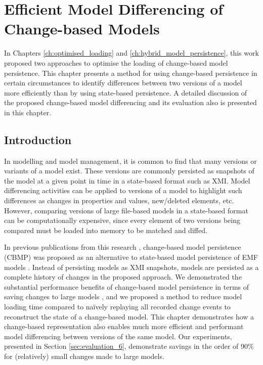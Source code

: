 \chapter{Efficient Model Differencing of Change-based Models}
\label{ch:model_differencing}

In Chapters \ref{ch:optimised_loading} and \ref{ch:hybrid_model_persistence}, this work proposed two approaches to optimise the loading of change-based model persistence. This chapter presents a method for using change-based persistence in certain circumstances to identify differences between two versions of a model more efficiently than by using state-based persistence. A detailed discussion of the proposed change-based model differencing and its evaluation also is presented in this chapter.

\section{Introduction}
\label{sec:introduction_06}
In modelling and model management, it is common to find that many versions or variants of a model exist. These versions are commonly persisted as snapshots of the model at a given point in time in a state-based format such as XMI. Model differencing activities can be applied to versions of a model to highlight such differences as changes in properties and values, new/deleted elements, etc. However, comparing versions of large file-based
models in a state-based format can be computationally expensive, since every element of two versions being compared must be loaded into memory to be matched and diffed.

In previous publications from this research \cite{DBLP:conf/models/YohannisKP17,yohannis2018towards,DBLP:conf/models/YohannisRPK18}, change-based model persistence (CBMP) was proposed as an alternative to state-based model persistence of EMF models \cite{steinberg2008emf}. Instead of persisting models as XMI snapshots, models are persisted as a complete history of changes in the proposed approach. We demonstrated the substantial performance benefits of change-based model persistence in terms of saving changes to large models \cite{DBLP:conf/models/YohannisKP17}, and we proposed a method to reduce model loading time compared to naïvely replaying all recorded change events \cite{DBLP:conf/models/YohannisRPK18} to reconstruct the state of a change-based model.
This chapter demonstrates how a change-based representation also enables much more efficient and performant model differencing between versions of the same model. Our experiments, presented in Section \ref{sec:evaluation_6}, demonstrate savings in the order of 90\% for (relatively) small changes made to large models.

